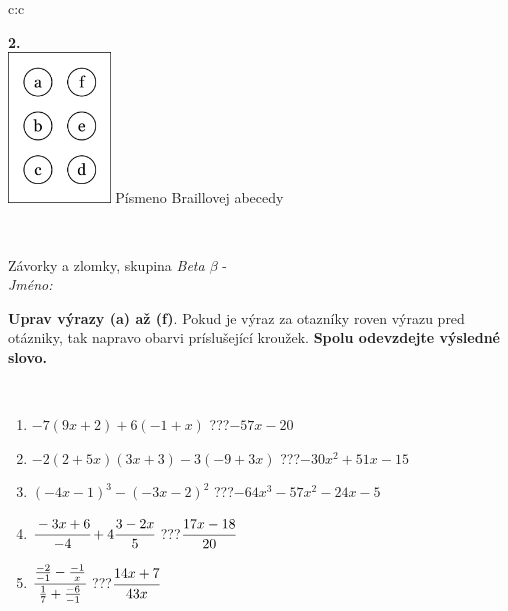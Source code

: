 \documentclass[10pt]{report}
\begin{document}
\begin{tabular}{c:c}
\begin{minipage}[c][104.5mm][t]{0.5\linewidth}
\begin{center}
\begin{minipage}{0.20\linewidth}
\begin{center}
{\Huge\bfseries 2.} \\[2mm]
\includegraphics[height=40mm]{../images/braille.png}
{\small Písmeno Braillovej abecedy}
\end{center}
\end{minipage}
\end{center}
\end{minipage}
\\ \hdashline
\begin{minipage}[c][104.5mm][t]{0.5\linewidth}
\begin{center}
\vspace{7mm}
{\huge Závorky a zlomky, skupina \textit{Beta $\beta$} -}\\[5mm]
\textit{Jméno:}\phantom{xxxxxxxxxxxxxxxxxxxxxxxxxxxxxxxxxxxxxxxxxxxxxxxxxxxxxxxxxxxxxxxxx}\\[5mm]
\begin{minipage}{0.95\linewidth}
\begin{center}
\textbf{Uprav výrazy (a) až (f)}. Pokud je výraz za otazníky roven výrazu pred otázniky, tak napravo obarvi príslušející kroužek. \textbf{Spolu odevzdejte výsledné slovo.}
\end{center}
\end{minipage}
\\[1mm]
\begin{minipage}{0.79\linewidth}
\begin{center}
\begin{varwidth}{\linewidth}
\begin{enumerate}
\normalsize
\item $-7(9x+2)+6(-1+x)$\quad \dotfill\; ???\;\dotfill \quad $-57x-20$
\item $-2(2+5x)(3x+3)-3(-9+3x)$\quad \dotfill\; ???\;\dotfill \quad $-30x^2+51x-15$
\item $(-4x-1)^3-(-3x-2)^2$\quad \dotfill\; ???\;\dotfill \quad $-64x^3-57x^2-24x-5$
\item $\cfrac{-3x+6}{-4}+4\cfrac{3-2x}{5}$\quad \dotfill\; ???\;\dotfill \quad $\cfrac{17x-18}{20}$
\item $\cfrac{\frac{-2}{-1}-\frac{-1}{x}}{\frac{1}{7}+\frac{-6}{-1}}$\quad \dotfill\; ???\;\dotfill \quad $\cfrac{14x+7}{43x}$

\end{enumerate}
\end{varwidth}
\end{center}
\end{minipage}
\end{center}
\end{minipage}
\end{tabular}
\end{document}
